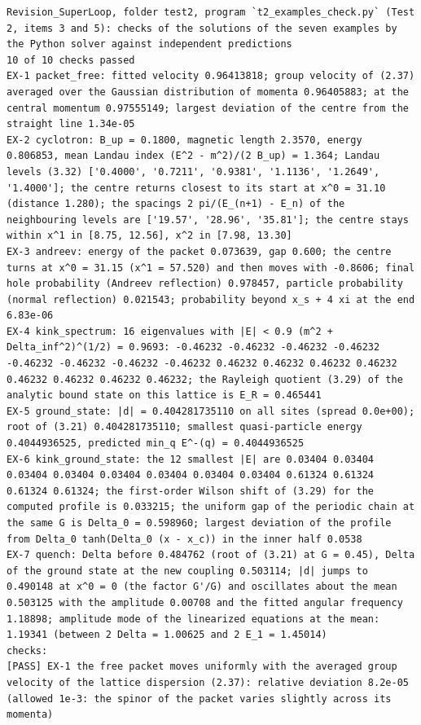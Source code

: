 \documentclass[
  10pt,
]{article}
\begin{document}
\begin{verbatim}
Revision_SuperLoop, folder test2, program `t2_examples_check.py` (Test 2, items 3 and 5): checks of the solutions of the seven examples by the Python solver against independent predictions
10 of 10 checks passed
EX-1 packet_free: fitted velocity 0.96413818; group velocity of (2.37) averaged over the Gaussian distribution of momenta 0.96405883; at the central momentum 0.97555149; largest deviation of the centre from the straight line 1.34e-05
EX-2 cyclotron: B_up = 0.1800, magnetic length 2.3570, energy 0.806853, mean Landau index (E^2 - m^2)/(2 B_up) = 1.364; Landau levels (3.32) ['0.4000', '0.7211', '0.9381', '1.1136', '1.2649', '1.4000']; the centre returns closest to its start at x^0 = 31.10 (distance 1.280); the spacings 2 pi/(E_(n+1) - E_n) of the neighbouring levels are ['19.57', '28.96', '35.81']; the centre stays within x^1 in [8.75, 12.56], x^2 in [7.98, 13.30]
EX-3 andreev: energy of the packet 0.073639, gap 0.600; the centre turns at x^0 = 31.15 (x^1 = 57.520) and then moves with -0.8606; final hole probability (Andreev reflection) 0.978457, particle probability (normal reflection) 0.021543; probability beyond x_s + 4 xi at the end 6.83e-06
EX-4 kink_spectrum: 16 eigenvalues with |E| < 0.9 (m^2 + Delta_inf^2)^(1/2) = 0.9693: -0.46232 -0.46232 -0.46232 -0.46232 -0.46232 -0.46232 -0.46232 -0.46232 0.46232 0.46232 0.46232 0.46232 0.46232 0.46232 0.46232 0.46232; the Rayleigh quotient (3.29) of the analytic bound state on this lattice is E_R = 0.465441
EX-5 ground_state: |d| = 0.404281735110 on all sites (spread 0.0e+00); root of (3.21) 0.404281735110; smallest quasi-particle energy 0.4044936525, predicted min_q E^-(q) = 0.4044936525
EX-6 kink_ground_state: the 12 smallest |E| are 0.03404 0.03404 0.03404 0.03404 0.03404 0.03404 0.03404 0.03404 0.61324 0.61324 0.61324 0.61324; the first-order Wilson shift of (3.29) for the computed profile is 0.033215; the uniform gap of the periodic chain at the same G is Delta_0 = 0.598960; largest deviation of the profile from Delta_0 tanh(Delta_0 (x - x_c)) in the inner half 0.0538
EX-7 quench: Delta before 0.484762 (root of (3.21) at G = 0.45), Delta of the ground state at the new coupling 0.503114; |d| jumps to 0.490148 at x^0 = 0 (the factor G'/G) and oscillates about the mean 0.503125 with the amplitude 0.00708 and the fitted angular frequency 1.18898; amplitude mode of the linearized equations at the mean: 1.19341 (between 2 Delta = 1.00625 and 2 E_1 = 1.45014)
checks:
[PASS] EX-1 the free packet moves uniformly with the averaged group velocity of the lattice dispersion (2.37): relative deviation 8.2e-05 (allowed 1e-3: the spinor of the packet varies slightly across its momenta)

\end{verbatim}
\end{document}
